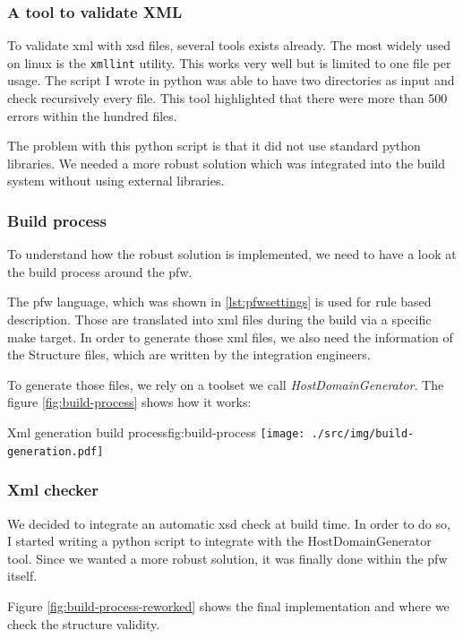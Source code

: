 \subsubsection{A tool to validate XML}
To validate \gls{xml} with \gls{xsd} files, several tools exists already. The most widely used on linux is the \lstinline{xmllint} utility.
This works very well but is limited to one file per usage. The script I wrote in \gls{python} was able to have two directories as input and check
recursively every file.
This tool highlighted that there were more than 500 errors within the hundred files.

The problem with this \gls{python} script is that it did not use standard \gls{python} libraries.
We needed a more robust solution which was integrated into the build system without using external libraries.

\subsubsection{Build process}
To understand how the robust solution is implemented, we need to have a look at the build process around the \gls{pfw}.

The pfw language, which was shown in \ref{lst:pfwsettings} is used for rule based
description. Those are translated into \gls{xml} files during the build via a
specific make target.  In order to generate those \gls{xml} files, we also need
the information of the Structure files, which are written by the integration
engineers.

To generate those files, we rely on a toolset we call \emph{HostDomainGenerator}.
The figure \ref{fig:build-process} shows how it works:

\begin{figureGraphics}{Xml generation build process}{fig:build-process}
    \texttt{[image: ./src/img/build-generation.pdf]}
\end{figureGraphics}

\subsubsection{Xml checker}

We decided to integrate an automatic \gls{xsd} check at build time. In order to do so, I started writing a \gls{python} script
to integrate with the HostDomainGenerator tool. Since we wanted a more robust solution, it was finally done within the \gls{pfw} itself.

Figure \ref{fig:build-process-reworked} shows the final implementation and where we check the structure validity.

